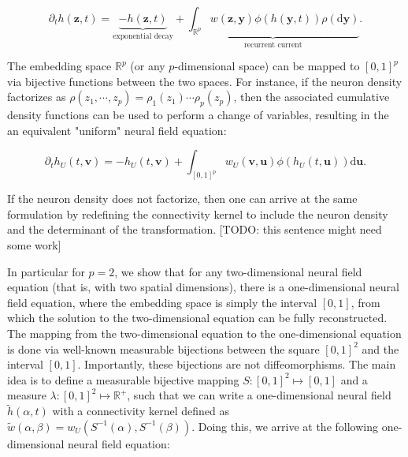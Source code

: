 \documentclass[NETN,manuscript]{stjour-new}
\def\R{\mathbb R}
\def\Rp{\R^p}
\renewcommand{\vec}[1]{\boldsymbol{#1}}
\begin{document}
\begin{equation} \label{eq:nf-in-rp}
\partial_t h(\vec z, t) = \underbrace{-h(\vec z, t)}_\text{exponential decay} + \underbrace{\int_{\mathbb{R}^p} w(\vec z, \vec y) \phi(h(\vec y, t)) \rho(\mathrm d \vec y)}_\text{recurrent current}.
\end{equation}

The embedding space $\Rp$ (or any $p$-dimensional space) can be mapped to $[0,1]^p$ via bijective functions between the two spaces. For instance, if the neuron density factorizes as $\rho(z_1, \cdots, z_p)= \rho_1(z_1) \cdots \rho_p(z_p)$, then the associated cumulative density functions can be used to perform a change of variables, resulting in the an equivalent "uniform" neural field equation:

\begin{equation} \label{eq:nf-in-01p}
\partial_t h_U(t, \vec v) = -h_U(t, \vec v) + \int_{[0,1]^p} w_U(\vec v, \vec u) \phi(h_U(t, \vec u)) \mathrm d \vec u.
\end{equation}

If the neuron density does not factorize, then one can arrive at the same formulation by redefining the connectivity kernel to include the neuron density and the determinant of the transformation. [TODO: this sentence might need some work]

In particular for $p=2$, we show that for any two-dimensional neural field equation (that is, with two spatial dimensions), there is a one-dimensional neural field equation, where the embedding space is simply the interval $[0,1]$, from which the solution to the two-dimensional equation can be fully reconstructed. The mapping from the two-dimensional equation to the one-dimensional equation is done via well-known measurable bijections between the square $[0,1]^2$ and the interval $[0,1]$. Importantly, these bijections are not diffeomorphisms.
The main idea is to define a measurable bijective mapping $S : [0,1]^2 \mapsto [0,1]$ and a measure $\lambda : [0,1]^2 \mapsto \mathbb{R}^+$, such that we can write a one-dimensional neural field	$\tilde h(\alpha, t)$ with a connectivity kernel defined as $\tilde w(\alpha, \beta) = w_U(S^{-1}(\alpha), S^{-1}(\beta))$. Doing this, we arrive at the following one-dimensional neural field equation: 
\end{document}
